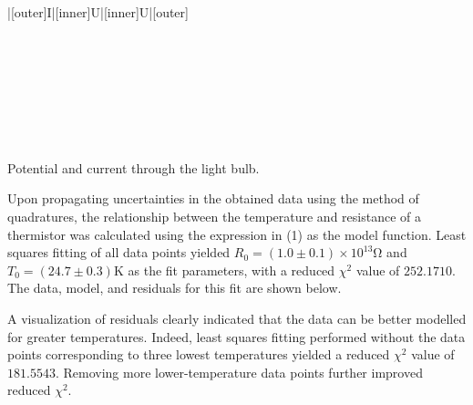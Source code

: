 \begin{paper}
{\begin{papertable}{|[outer]I|[inner]U|[inner]U|[outer]}
			\papertableindex{}\\\paperiline
			\papertableindex{}\\\paperiline
			\papertableindex{}\\\paperiline
			\papertableindex{}\\\paperiline
			\papertableindex{}\\\paperiline
			\papertableindex{}\\\paperiline
			\papertableindex{}\\\paperiline
			\papertableindex{}\\\paperoline
			\end{papertable}\vspace{-1.5em}}
	{Potential and current through the light bulb.} 

	
	Upon propagating uncertainties in the obtained data using the method of quadratures, the relationship between the temperature and resistance of a thermistor was calculated using the expression in (1) as the model function. Least squares fitting of all data points yielded \( R_0 = (1.0 \pm 0.1) \times 10^{13} \si{\ohm} \) and \( T_0 = (24.7 \pm 0.3) \si{\kelvin} \) as the fit parameters, with a reduced \( \chi ^ 2 \) value of \( 252.1710 \). The data, model, and residuals for this fit are shown below.
	
	 \vspace{1em}
	
	A visualization of residuals clearly indicated that the data can be better modelled for greater temperatures. Indeed, least squares fitting performed without the data points corresponding to three lowest temperatures yielded a reduced \( \chi ^ 2 \) value of \( 181.5543 \). Removing more lower-temperature data points further improved reduced \( \chi ^ 2 \). 
	

\end{paper}

